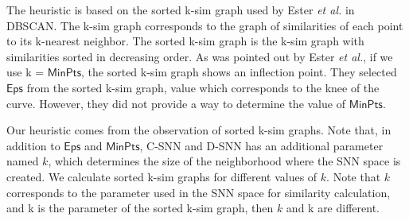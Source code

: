 \documentclass[preprint,12pt,authoryear,review]{elsarticle}
\begin{document}
The heuristic is based on the sorted k-sim graph used by Ester \textit{et al.} \cite{E96} in DBSCAN. The k-sim graph corresponds to the graph of similarities of each point to its k-nearest neighbor. The sorted k-sim graph is the k-sim graph with similarities sorted in decreasing order. As was pointed out by Ester \textit{et al.}, if we use k = $\mathsf{MinPts}$, the sorted k-sim graph shows an inflection point. They selected $\mathsf{Eps}$ from the sorted k-sim graph, value which corresponds to the knee of the curve. 
However, they did not provide a way to determine the value of $\mathsf{MinPts}$. 

Our heuristic comes from the observation of sorted k-sim graphs. 
Note that, in addition to $\mathsf{Eps}$ and $\mathsf{MinPts}$, C-SNN and D-SNN has an additional parameter named $k$, which determines the size of the neighborhood where the SNN space is created. 
We calculate sorted k-sim graphs for different values of $k$. 
Note that $k$ corresponds to the parameter used in the SNN space for similarity calculation, and k is the parameter of the sorted k-sim graph, then $k$ and k are different. 
\end{document}
